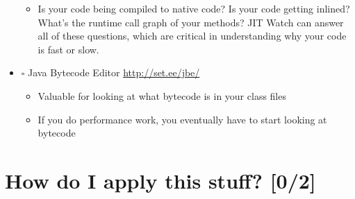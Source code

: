 \documentclass[11pt]{article}
\begin{document}
\begin{itemize}
\begin{itemize}
\item Is your code being compiled to native code? Is your code getting inlined? What's the runtime call graph of your methods? JIT Watch can answer all of these questions, which are critical in understanding why your code is fast or slow.
\end{itemize}

\item $\square$ Java Bytecode Editor \url{http://set.ee/jbe/}

\begin{itemize}
\item Valuable for looking at what bytecode is in your class files

\item If you do performance work, you eventually have to start looking at bytecode
\end{itemize}
\end{itemize}
\section{How do I apply this stuff? [0/2]}
\label{sec:orgheadline10}
\end{document}
